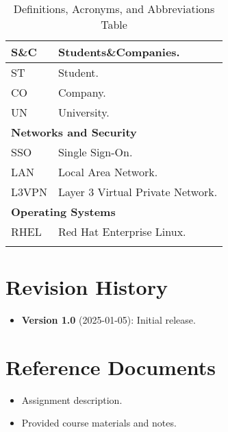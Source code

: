 \begin{longtable}{|l|p{}|}
      \hline
      S\&C             & Students\&Companies.                              \\
      \hline
      ST               & Student.                                          \\
      \hline
      CO               & Company.                                          \\
      \hline
      UN               & University.                                       \\
      \hline
      \multicolumn{2}{|l|}{\textbf{Networks and Security}}                 \\
      \hline
      SSO              & Single Sign-On.                                   \\
      \hline
      LAN              & Local Area Network.                               \\
      \hline
      L3VPN            & Layer 3 Virtual Private Network.                  \\
      \hline
      \multicolumn{2}{|l|}{\textbf{Operating Systems}}                     \\
      \hline
      RHEL             & Red Hat Enterprise Linux.                         \\
      \hline
      \caption{Definitions, Acronyms, and Abbreviations Table}
      \label{tab:definitions-acronyms-abbreviations}
\end{longtable}

\section{Revision History}
\label{sec:revision-history}%

\begin{itemize}
      \item \textbf{Version 1.0} (2025-01-05): Initial release.
\end{itemize}

\section{Reference Documents}
\label{sec:reference-documents}%

\begin{itemize}
      \item Assignment description.
      \item Provided course materials and notes.
\end{itemize}

